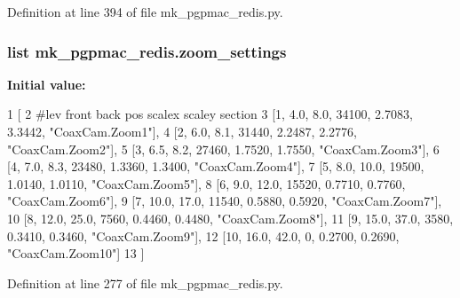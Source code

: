 Definition at line 394 of file mk\-\_\-pgpmac\-\_\-redis.\-py.

\hypertarget{namespacemk__pgpmac__redis_ad91bac9be746f99e1cf1f8e28ff348be}{
\subsubsection[{zoom\-\_\-settings}]{\setlength{\rightskip}{0pt plus 5cm}list mk\-\_\-pgpmac\-\_\-redis.\-zoom\-\_\-settings}}\label{namespacemk__pgpmac__redis_ad91bac9be746f99e1cf1f8e28ff348be}
{\bfseries Initial value\-:}
\begin{DoxyCode}
1 [
2     \textcolor{comment}{#lev   front  back  pos     scalex  scaley   section}
3     [1,     4.0,   8.0,  34100, 2.7083,  3.3442, \textcolor{stringliteral}{"CoaxCam.Zoom1"}],
4     [2,     6.0,   8.1,  31440, 2.2487,  2.2776, \textcolor{stringliteral}{"CoaxCam.Zoom2"}],
5     [3,     6.5,   8.2,  27460, 1.7520,  1.7550, \textcolor{stringliteral}{"CoaxCam.Zoom3"}],
6     [4,     7.0,   8.3,  23480, 1.3360,  1.3400, \textcolor{stringliteral}{"CoaxCam.Zoom4"}],
7     [5,     8.0,  10.0,  19500, 1.0140,  1.0110, \textcolor{stringliteral}{"CoaxCam.Zoom5"}],
8     [6,     9.0,  12.0,  15520, 0.7710,  0.7760, \textcolor{stringliteral}{"CoaxCam.Zoom6"}],
9     [7,    10.0,  17.0,  11540, 0.5880,  0.5920, \textcolor{stringliteral}{"CoaxCam.Zoom7"}],
10     [8,    12.0,  25.0,   7560, 0.4460,  0.4480, \textcolor{stringliteral}{"CoaxCam.Zoom8"}],
11     [9,    15.0,  37.0,   3580, 0.3410,  0.3460, \textcolor{stringliteral}{"CoaxCam.Zoom9"}],
12     [10,   16.0,  42.0,      0, 0.2700,  0.2690, \textcolor{stringliteral}{"CoaxCam.Zoom10"}]
13     ]
\end{DoxyCode}


Definition at line 277 of file mk\-\_\-pgpmac\-\_\-redis.\-py.


